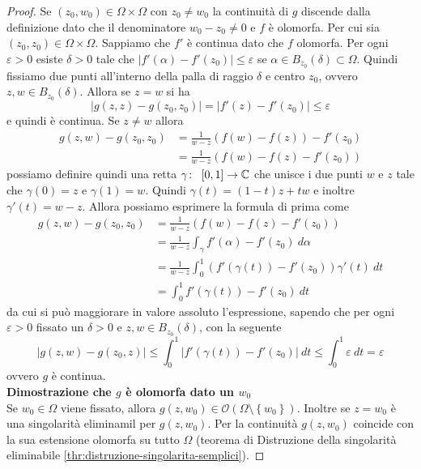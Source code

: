 \begin{proof}
    Se $(z_0, w_0) \in \Omega\times\Omega$ con $z_0 \neq w_0$ la
    continuità di $g$ discende dalla definizione dato che il denominatore
    $w_0 - z_0 \neq 0$ e $f$ è olomorfa. 
    Per cui sia $(z_0, z_0) \in \Omega \times \Omega$. Sappiamo che $f'$
    è continua dato che $f$ olomorfa. Per ogni $\varepsilon > 0$ esiste $\delta
    >0$ tale che $|f'(\alpha) - f'(z_0)| \le \varepsilon$ se $\alpha \in
    B_{z_0}(\delta) \subset \Omega$. Quindi fissiamo due punti all'interno
    della palla di raggio $\delta$ e centro $z_0$, ovvero $z,w \in
    B_{z_0}(\delta)$. Allora se $z = w$ si ha 
    \begin{equation*}
      |g(z,z) - g(z_0,z_0)| = |f'(z) - f'(z_0)| \le \varepsilon
    \end{equation*}
    e quindi è continua. Se $z \neq w$ allora
    \begin{align*}
    g(z,w) - g(z_0, z_0) & = \frac{1}{w-z}(f(w) - f(z)) - f'(z_0) \\
    & = \frac{1}{w-z}(f(w)- f(z) - f'(z_0)) 
    \end{align*}
    possiamo definire quindi una retta $\gamma \colon\ \left[0,1
    \right] \rightarrow \mathbb{C}$ che unisce i due punti $w$ e $z$ tale che 
    $\gamma(0) = z$ e $\gamma(1) = w$. Quindi $\gamma(t) = (1-t)z+ tw$
    e inoltre $\gamma'(t) = w - z$. Allora possiamo esprimere la formula di
    prima come
    \begin{align*}
       g(z,w) - g(z_0, z_0) & = \frac{1}{w-z}(f(w)- f(z) - f'(z_0)) \\
        & = \frac{1}{w-z} \int_\gamma f'(\alpha) - f'(z_0)\ d\alpha \\
        & = \frac{1}{w-z} \int^1_0 (f'(\gamma(t)) - f'(z_0)) \gamma'(t)\
        dt \\
        & = \int^1_0 f'(\gamma(t)) - f'(z_0)\ dt
    \end{align*}
    da cui si può maggiorare in valore assoluto l'espressione, sapendo
    che per ogni $\varepsilon > 0$ fissato un $\delta >0$ e $z,w \in
    B_{z_0}(\delta)$, con la seguente
    \begin{equation*}
      |g(z,w) - g(z_0,z)| \le \int^1_0 |f'(\gamma(t)) - f'(z_0)|\ dt \le
      \int^1_0 \varepsilon\ dt = \varepsilon
    \end{equation*}
    ovvero $g$ è continua.\\

   \textbf{Dimostrazione che $g$ è olomorfa dato un $w_0$} \\

   Se $w_0 \in \Omega$ viene fissato, allora $g(z, w_0) \in
   \mathcal{O}(\Omega\setminus\left\{ w_0 \right\})$. Inoltre se $z = w_0$
   è una singolarità eliminamil per $g(z,w_0)$. Per la continuità $g(z,w_0)$
   coincide con la sua estensione olomorfa su tutto $\Omega$ (teorema di
     Distruzione della singolarità eliminabile
   \ref{thr:distruzione-singolarita-semplici}).
 \end{proof}

